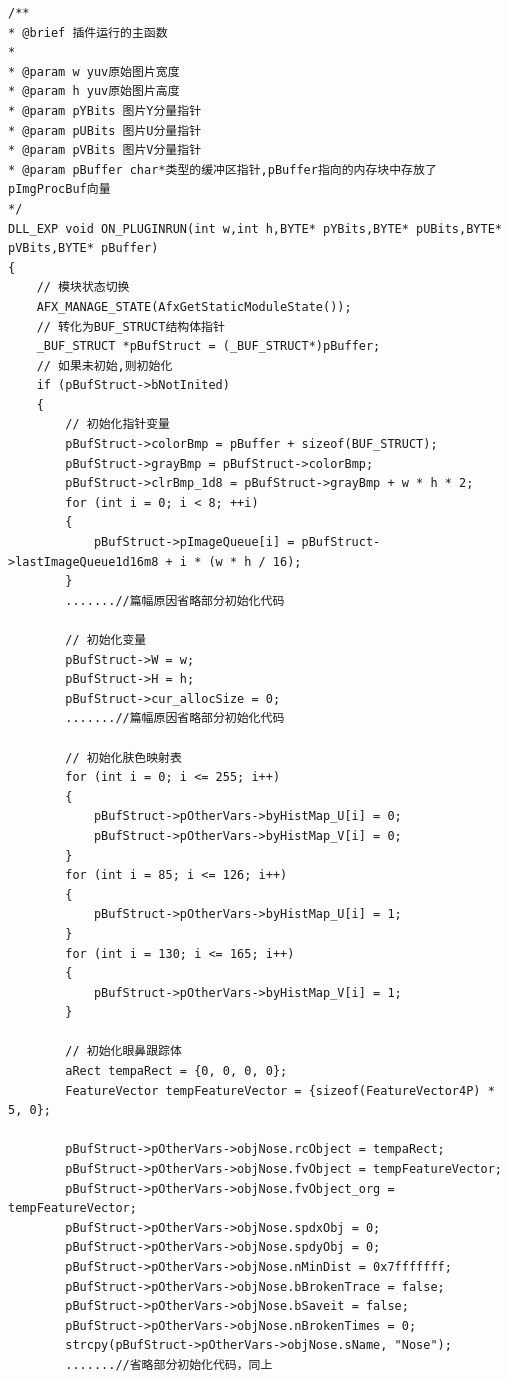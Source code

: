 \documentclass[12pt,hyperref,a4paper,UTF8]{ctexart}
\begin{document}
        \begin{lstlisting}[caption={插件主函数}, label={lst:example}]
/**
* @brief 插件运行的主函数
* 
* @param w yuv原始图片宽度
* @param h yuv原始图片高度 
* @param pYBits 图片Y分量指针
* @param pUBits 图片U分量指针
* @param pVBits 图片V分量指针
* @param pBuffer char*类型的缓冲区指针,pBuffer指向的内存块中存放了pImgProcBuf向量 
*/
DLL_EXP void ON_PLUGINRUN(int w,int h,BYTE* pYBits,BYTE* pUBits,BYTE* pVBits,BYTE* pBuffer)
{
    // 模块状态切换
    AFX_MANAGE_STATE(AfxGetStaticModuleState());
    // 转化为BUF_STRUCT结构体指针
    _BUF_STRUCT *pBufStruct = (_BUF_STRUCT*)pBuffer;
    // 如果未初始,则初始化
    if (pBufStruct->bNotInited)
    {
        // 初始化指针变量
        pBufStruct->colorBmp = pBuffer + sizeof(BUF_STRUCT);
        pBufStruct->grayBmp = pBufStruct->colorBmp;
        pBufStruct->clrBmp_1d8 = pBufStruct->grayBmp + w * h * 2;
        for (int i = 0; i < 8; ++i)
        {
            pBufStruct->pImageQueue[i] = pBufStruct->lastImageQueue1d16m8 + i * (w * h / 16);
        }
        .......//篇幅原因省略部分初始化代码

        // 初始化变量
        pBufStruct->W = w;
        pBufStruct->H = h;
        pBufStruct->cur_allocSize = 0;
        .......//篇幅原因省略部分初始化代码

        // 初始化肤色映射表
        for (int i = 0; i <= 255; i++)
        {
            pBufStruct->pOtherVars->byHistMap_U[i] = 0;
            pBufStruct->pOtherVars->byHistMap_V[i] = 0;
        }
        for (int i = 85; i <= 126; i++)
        {
            pBufStruct->pOtherVars->byHistMap_U[i] = 1;
        }
        for (int i = 130; i <= 165; i++)
        {
            pBufStruct->pOtherVars->byHistMap_V[i] = 1;
        }

        // 初始化眼鼻跟踪体
        aRect tempaRect = {0, 0, 0, 0};
        FeatureVector tempFeatureVector = {sizeof(FeatureVector4P) * 5, 0};

        pBufStruct->pOtherVars->objNose.rcObject = tempaRect;
        pBufStruct->pOtherVars->objNose.fvObject = tempFeatureVector;
        pBufStruct->pOtherVars->objNose.fvObject_org = tempFeatureVector;
        pBufStruct->pOtherVars->objNose.spdxObj = 0;
        pBufStruct->pOtherVars->objNose.spdyObj = 0;
        pBufStruct->pOtherVars->objNose.nMinDist = 0x7fffffff;
        pBufStruct->pOtherVars->objNose.bBrokenTrace = false;
        pBufStruct->pOtherVars->objNose.bSaveit = false;
        pBufStruct->pOtherVars->objNose.nBrokenTimes = 0;
        strcpy(pBufStruct->pOtherVars->objNose.sName, "Nose");
        .......//省略部分初始化代码，同上


\end{lstlisting}
\end{document}
